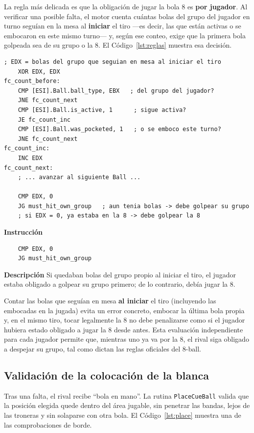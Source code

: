 \documentclass[a4paper,12pt]{article}
\begin{document}
La regla más delicada es que la obligación de jugar la bola 8 es \textbf{por jugador}. Al verificar una posible falta, el motor cuenta cuántas bolas del grupo del jugador en turno seguían en la mesa al \textbf{iniciar} el tiro ---es decir, las que están activas o se embocaron en este mismo turno--- y, según ese conteo, exige que la primera bola golpeada sea de su grupo o la 8. El Código~\ref{lst:reglas} muestra esa decisión.

\begin{lstlisting}[style=assemblyStyle, caption={Decisión por jugador: ¿debe golpear su grupo o la bola 8?}, label={lst:reglas}]
    ; EDX = bolas del grupo que seguian en mesa al iniciar el tiro
    XOR EDX, EDX
fc_count_before:
    CMP [ESI].Ball.ball_type, EBX   ; del grupo del jugador?
    JNE fc_count_next
    CMP [ESI].Ball.is_active, 1      ; sigue activa?
    JE fc_count_inc
    CMP [ESI].Ball.was_pocketed, 1   ; o se emboco este turno?
    JNE fc_count_next
fc_count_inc:
    INC EDX
fc_count_next:
    ; ... avanzar al siguiente Ball ...

    CMP EDX, 0
    JG must_hit_own_group   ; aun tenia bolas -> debe golpear su grupo
    ; si EDX = 0, ya estaba en la 8 -> debe golpear la 8
\end{lstlisting}

\begin{instruccionbox}
\textbf{Instrucción}
\begin{lstlisting}
    CMP EDX, 0
    JG must_hit_own_group
\end{lstlisting}
\textbf{Descripción}
Si quedaban bolas del grupo propio al iniciar el tiro, el jugador estaba obligado a golpear su grupo primero; de lo contrario, debía jugar la 8.
\end{instruccionbox}

Contar las bolas que seguían en mesa \textbf{al iniciar} el tiro (incluyendo las embocadas en la jugada) evita un error concreto, embocar la última bola propia y, en el mismo tiro, tocar legalmente la 8 no debe penalizarse como si el jugador hubiera estado obligado a jugar la 8 desde antes. Esta evaluación independiente para cada jugador permite que, mientras uno ya va por la 8, el rival siga obligado a despejar su grupo, tal como dictan las reglas oficiales del 8-ball.

\subsection{Validación de la colocación de la blanca}
Tras una falta, el rival recibe ``bola en mano''. La rutina \texttt{PlaceCueBall} valida que la posición elegida quede dentro del área jugable, sin penetrar las bandas, lejos de las troneras y sin solaparse con otra bola. El Código~\ref{lst:place} muestra una de las comprobaciones de borde.
\end{document}
